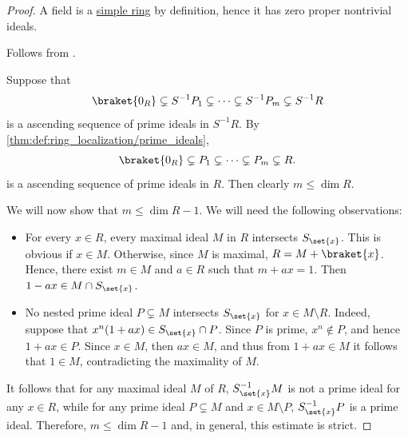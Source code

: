 \begin{proof}
   A field is a \hyperref[def:ring/simple]{simple ring} by definition, hence it has zero proper nontrivial ideals.

   Follows from .

   Suppose that
  \begin{equation*}
    \braket{ 0_R } \subsetneq S^{-1} P_1 \subsetneq \cdots \subsetneq S^{-1} P_m \subsetneq S^{-1} R
  \end{equation*}
  is a ascending sequence of prime ideals in \( S^{-1} R \). By \cref{thm:def:ring_localization/prime_ideals},
  \begin{equation*}
    \braket{ 0_R } \subsetneq P_1 \subsetneq \cdots \subsetneq P_m \subsetneq R.
  \end{equation*}
  is a ascending sequence of prime ideals in \( R \). Then clearly \( m \leq \dim R \).

  We will now show that \( m \leq \dim R - 1 \). We will need the following observations:
  \begin{itemize}
    \item For every \( x \in R \), every maximal ideal \( M \) in \( R \) intersects \( S_{\set{ x }} \). This is obvious if \( x \in M \). Otherwise, since \( M \) is maximal, \( R = M + \braket{ x } \). Hence, there exist \( m \in M \) and \( a \in R \) such that \( m + ax = 1 \). Then \( 1 - ax \in M \cap S_{\set{ x }} \).

    \item No nested prime ideal \( P \subsetneq M \) intersects \( S_{\set{ x }} \) for \( x \in M \setminus R \). Indeed, suppose that \( x^n(1 + ax) \in S_{\set{ x }} \cap P \). Since \( P \) is prime, \( x^n \notin P \), and hence \( 1 + ax \in P \). Since \( x \in M \), then \( ax \in M \), and thus from \( 1 + ax \in M \) it follows that \( 1 \in M \), contradicting the maximality of \( M \).
  \end{itemize}

  It follows that for any maximal ideal \( M \) of \( R \), \( S_{\set{ x }}^{-1} M \) is not a prime ideal for any \( x \in R \), while for any prime ideal \( P \subsetneq M \) and \( x \in M \setminus P \), \( S_{\set{ x }}^{-1} P \) is a prime ideal. Therefore, \( m \leq \dim R - 1 \) and, in general, this estimate is strict.



\end{proof}
